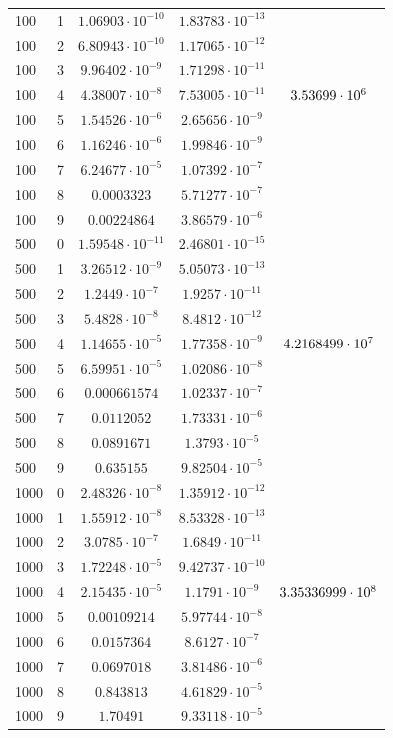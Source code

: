 \documentclass[english]{article}
\begin{document}
\begin{center}
\begin{longtable}{l|l|c|c|c}
    100 & 1 & \(1.06903\cdot 10^{-10} \)& \(1.83783\cdot 10^{-13}\) & \\
    100 & 2 & \(6.80943\cdot 10^{-10} \)& \(1.17065\cdot 10^{-12}\) & \\
    100 & 3 & \(9.96402\cdot 10^{-9} \)& \(1.71298\cdot 10^{-11}\) & \\
    100 & 4 & \(4.38007\cdot 10^{-8} \)& \(7.53005\cdot 10^{-11}\) & \({\large 3.53699\cdot 10^6}\) \\
    100 & 5 & \(1.54526\cdot 10^{-6} \)& \(2.65656\cdot 10^{-9}\) & \\
    100 & 6 & \(1.16246\cdot 10^{-6} \)& \(1.99846\cdot 10^{-9}\) & \\
    100 & 7 & \(6.24677\cdot 10^{-5} \)& \(1.07392\cdot 10^{-7}\) & \\
    100 & 8 & \(0.0003323   \)& \(5.71277\cdot 10^{-7}\) & \\
    100 & 9 & \(0.00224864  \)& \(3.86579\cdot 10^{-6}\) & \\
    \hline
    500 & 0 & \(1.59548\cdot 10^{-11} \)& \(2.46801\cdot 10^{-15}\) & \\
    500 & 1 & \(3.26512\cdot 10^{-9} \)& \(5.05073\cdot 10^{-13}\) & \\
    500 & 2 & \(1.2449\cdot 10^{-7}  \)& \(1.9257\cdot 10^{-11}\) & \\
    500 & 3 & \(5.4828\cdot 10^{-8}  \)& \(8.4812\cdot 10^{-12}\) & \\
    500 & 4 & \(1.14655\cdot 10^{-5} \)& \(1.77358\cdot 10^{-9}\) & \({\large 4.2168499 \cdot 10^{7}}\) \\
    500 & 5 & \(6.59951\cdot 10^{-5} \)& \(1.02086\cdot 10^{-8}\) & \\
    500 & 6 & \(0.000661574 \)& \(1.02337\cdot 10^{-7}\) & \\
    500 & 7 & \(0.0112052   \)& \(1.73331\cdot 10^{-6}\) & \\
    500 & 8 & \(0.0891671   \)& \(1.3793\cdot 10^{-5}\) & \\
    500 & 9 & \(0.635155    \)& \(9.82504\cdot 10^{-5}\) & \\
    \hline
    1000 & 0 & \(2.48326\cdot 10^{-8} \)& \(1.35912\cdot 10^{-12}\) & \\
    1000 & 1 & \(1.55912\cdot 10^{-8} \)& \(8.53328\cdot 10^{-13}\) & \\
    1000 & 2 & \(3.0785\cdot 10^{-7}  \)& \(1.6849\cdot 10^{-11}\) & \\
    1000 & 3 & \(1.72248\cdot 10^{-5} \)& \(9.42737\cdot 10^{-10}\) & \\
    1000 & 4 & \(2.15435\cdot 10^{-5} \)& \(1.1791\cdot 10^{-9}\) & \({\large 3.35336999 \cdot 10^8 }\) \\
    1000 & 5 & \(0.00109214  \)& \(5.97744\cdot 10^{-8}\) & \\
    1000 & 6 & \(0.0157364   \)& \(8.6127\cdot 10^{-7}\) & \\
    1000 & 7 & \(0.0697018   \)& \(3.81486\cdot 10^{-6}\) & \\
    1000 & 8 & \(0.843813    \)& \(4.61829\cdot 10^{-5}\) & \\
    1000 & 9 & \(1.70491     \)& \(9.33118\cdot 10^{-5}\)
  \end{longtable}
\end{center}
\end{document}
